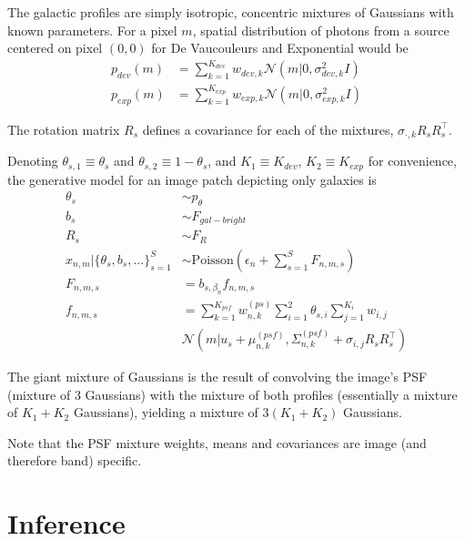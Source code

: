 \documentclass[11pt]{article}
\newcommand{\trans}{\intercal}
\begin{document}

The galactic profiles are simply isotropic, concentric mixtures of Gaussians with known parameters.  For a pixel $m$, spatial distribution of photons from a source centered on pixel $(0,0)$ for De Vaucouleurs and Exponential would be
\begin{align}
  p_{dev}(m) &= \sum_{k=1}^{K_{dev}} w_{dev, k} \mathcal{N}\left(m | 0, \sigma^2_{dev, k} I \right) \\
  p_{exp}(m) &= \sum_{k=1}^{K_{exp}} w_{exp, k} \mathcal{N}\left(m | 0, \sigma^2_{exp, k} I \right)
\end{align}

The rotation matrix $R_s$ defines a covariance for each of the mixtures, $\sigma_{\cdot, k} R_s R_s^\trans$. 

Denoting $\theta_{s,1} \equiv \theta_{s}$ and $\theta_{s,2} \equiv 1-\theta_{s}$, and $K_1 \equiv K_{dev}$, $K_2 \equiv K_{exp}$ for convenience, the generative model for an image patch depicting only galaxies is 
\begin{align}
  \theta_s &\sim p_\theta \\
  b_s      &\sim F_{gal-bright} \\
  R_s      &\sim F_{R} \\
  x_{n,m} | \{ \theta_s, b_s,...\}_{s=1}^S &\sim \textrm{Poisson}\left( \epsilon_n + \sum_{s=1}^S F_{n,m,s} \right) \\
  F_{n,m,s} &= b_{s, \beta_n} f_{n,m,s} \\
  f_{n,m,s} 
    &= \sum_{k=1}^{K_{psf}} w^{(ps)}_{n,k} 
       \sum_{i=1}^2 \theta_{s,i} 
       \sum_{j=1}^{K_i} w_{i, j} \\
       & \mathcal{N} \left(m | u_s + \mu^{(psf)}_{n,k}, \Sigma^{(psf)}_{n,k} + \sigma_{i,j} R_s R_s^\trans \right)
\end{align}

The giant mixture of Gaussians is the result of convolving the image's PSF (mixture of 3 Gaussians) with the mixture of both profiles (essentially a mixture of $K_1 + K_2$ Gaussians), yielding a mixture of $3(K_1 + K_2)$ Gaussians.  
 
Note that the PSF mixture weights, means and covariances are image (and therefore band) specific. 


\section{Inference}
\end{document}
